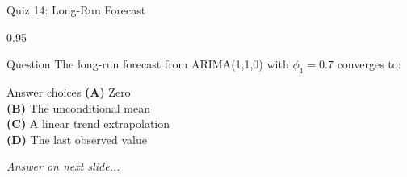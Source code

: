 \documentclass[9pt, aspectratio=169, t]{beamer}
\begin{document}
\begin{frame}{Quiz 14: Long-Run Forecast}
    \begin{cminipage}{0.95\textwidth}
    \begin{alertblock}{Question}
        The long-run forecast from ARIMA(1,1,0) with $\phi_1 = 0.7$ converges to:
    \end{alertblock}

    \vspace{0.4cm}

    \begin{block}{Answer choices}
        \textcolor{MainBlue}{\textbf{(A)}} Zero\\[3pt]
        \textcolor{MainBlue}{\textbf{(B)}} The unconditional mean\\[3pt]
        \textcolor{MainBlue}{\textbf{(C)}} A linear trend extrapolation\\[3pt]
        \textcolor{MainBlue}{\textbf{(D)}} The last observed value
    \end{block}

    \vspace{0.5cm}

    \begin{center}
        \textit{Answer on next slide...}
    \end{center}
    \end{cminipage}
\end{frame}
\end{document}
